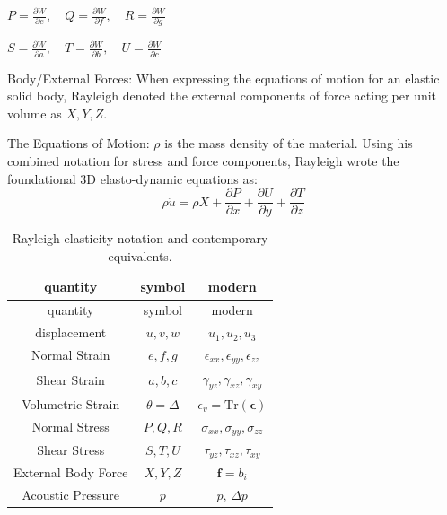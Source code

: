 \(P=\frac{\partial W}{\partial e},\quad Q=\frac{\partial W}{\partial f},\quad R=\frac{\partial W}{\partial g}\)

\(S=\frac{\partial W}{\partial a},\quad T=\frac{\partial W}{\partial b},\quad U=\frac{\partial W}{\partial c}\)

Body/External Forces: When expressing the equations of motion for an
elastic solid body, Rayleigh denoted the external components of force
acting per unit volume as \(X, Y, Z\).

The Equations of Motion: \(\rho \) is the mass density of the material.
Using his combined notation for stress and force components, Rayleigh
wrote the foundational 3D elasto-dynamic equations as:
\[\rho \ddot{u}=\rho X+
\frac{\partial P}{\partial x}+
\frac{\partial U}{\partial y}+
\frac{\partial T}{\partial z}\]

\begin{longtable}[]{@{}ccc@{}}
\caption{Rayleigh elasticity notation and contemporary equivalents.}\label{tbl:nomenclature1}
\tabularnewline%
quantity & symbol & modern \\
\midrule\noalign{}
\endfirsthead%
\toprule\noalign{}
quantity & symbol & modern \\
\midrule\noalign{}
\endhead%
\endlastfoot{}%
displacement & \(u, v, w\) & \(u_1, u_2, u_3\) \\
Normal Strain & \(e, f, g\) &
\(\epsilon_{xx}, \epsilon_{yy}, \epsilon_{zz}\) \\
Shear Strain & \(a, b, c\) &
\(\gamma_{yz}, \gamma_{xz}, \gamma_{xy}\) \\
Volumetric Strain & \(\theta = \Delta \) &
\(\epsilon_{v}= \text{Tr}(\boldsymbol{\epsilon})\) \\
Normal Stress & \(P, Q, R\) &
\(\sigma_{xx}, \sigma_{yy}, \sigma_{zz}\) \\
Shear Stress & \(S, T, U\) & \(\tau_{yz}, \tau_{xz}, \tau_{xy}\) \\
External Body Force & \(X, Y, Z\) & \(\mathbf{f} = b_{i}\) \\
Acoustic Pressure & \(p\) & \(p\), \(\Delta p\) \\
\end{longtable}


